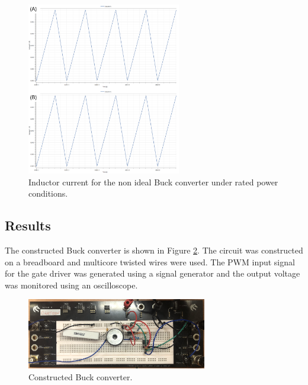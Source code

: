 \documentclass[12pt,twoside]{scrartcl}
\begin{document}

\begin{figure}[h!]
    \centering
    \includegraphics[width=0.6\textwidth]{buck_NIDCM}
    \caption{Inductor current for the non ideal Buck converter under rated power conditions.}
    \label{fig:buck_NIDCM}
\end{figure}
\newpage
\subsection{Results}
The constructed Buck converter is shown in Figure \ref{fig:buck_real}. The circuit was constructed on a breadboard and multicore twisted wires were used. The PWM input signal for the gate driver was generated using a signal generator and the output voltage was monitored using an oscilloscope. \par

\begin{figure}[h]
    \centering
    \includegraphics[width=0.7\textwidth]{buck_real}
    \caption{Constructed Buck converter.}
    \label{fig:buck_real}
\end{figure}
\end{document}
